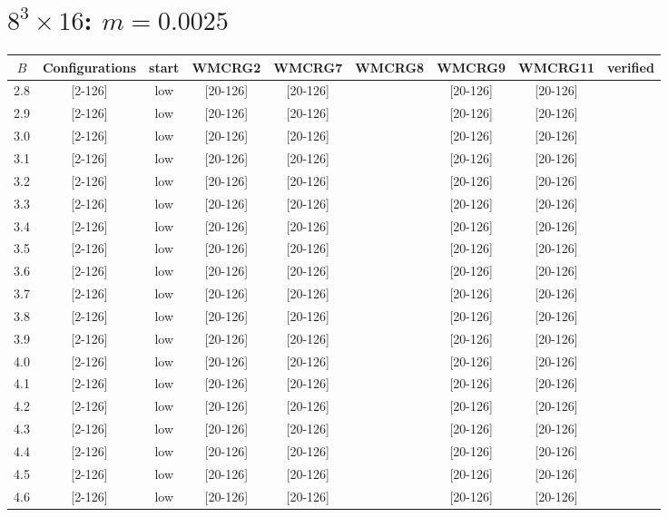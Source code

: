 \documentclass{article}
\begin{document}
  \section*{$8^3\times16$:  $m=0.0025$}
    \begin{tabular}{| c | c | c | c | c | c | c | c | c |}
      \hline
      $B$ & Configurations & start & WMCRG2 & WMCRG7 & WMCRG8 & WMCRG9 & WMCRG11 & verified\\
      \hline
      2.8 & [2-126] & low & [20-126] & [20-126] &  & [20-126] & [20-126] &\\
      2.9 & [2-126] & low & [20-126] & [20-126] &  & [20-126] & [20-126] &\\
      3.0 & [2-126] & low & [20-126] & [20-126] &  & [20-126] & [20-126] &\\
      3.1 & [2-126] & low & [20-126] & [20-126] &  & [20-126] & [20-126] &\\
      3.2 & [2-126] & low & [20-126] & [20-126] &  & [20-126] & [20-126] &\\
      3.3 & [2-126] & low & [20-126] & [20-126] &  & [20-126] & [20-126] &\\
      3.4 & [2-126] & low & [20-126] & [20-126] &  & [20-126] & [20-126] &\\
      3.5 & [2-126] & low & [20-126] & [20-126] &  & [20-126] & [20-126] &\\
      3.6 & [2-126] & low & [20-126] & [20-126] &  & [20-126] & [20-126] &\\
      3.7 & [2-126] & low & [20-126] & [20-126] &  & [20-126] & [20-126] &\\
      3.8 & [2-126] & low & [20-126] & [20-126] &  & [20-126] & [20-126] &\\
      3.9 & [2-126] & low & [20-126] & [20-126] &  & [20-126] & [20-126] &\\
      4.0 & [2-126] & low & [20-126] & [20-126] &  & [20-126] & [20-126] &\\
      4.1 & [2-126] & low & [20-126] & [20-126] &  & [20-126] & [20-126] &\\
      4.2 & [2-126] & low & [20-126] & [20-126] &  & [20-126] & [20-126] &\\
      4.3 & [2-126] & low & [20-126] & [20-126] &  & [20-126] & [20-126] &\\
      4.4 & [2-126] & low & [20-126] & [20-126] &  & [20-126] & [20-126] &\\
      4.5 & [2-126] & low & [20-126] & [20-126] &  & [20-126] & [20-126] &\\
      4.6 & [2-126] & low & [20-126] & [20-126] &  & [20-126] & [20-126] &\\

\end{tabular}
\end{document}
